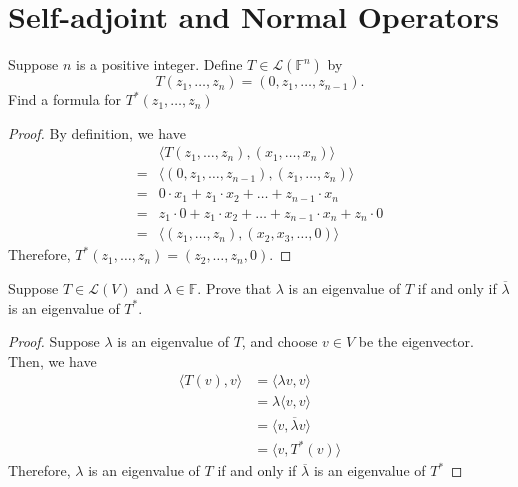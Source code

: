 \section{Self-adjoint and Normal Operators}
\begin{exercise}
  Suppose $n$ is a positive integer. Define $T \in \mathcal{L}(\mathbb{F}^n)$ by \[
    T(z_1, \dots, z_n) = (0, z_1, \dots, z_{n-1}).
  \] Find a formula for $T^*(z_1,\dots,z_n)$
\end{exercise}

\begin{proof}
  By definition, we have
  \begin{equation*}
    \begin{aligned}
      &\langle T(z_1, \dots, z_n), (x_1, \dots ,x_n) \rangle \\
      = &\langle (0, z_1, \dots, z_{n-1}), (z_1, \dots, z_n) \rangle \\
      = &0 \cdot x_1 + z_1 \cdot x_2 + \dots + z_{n-1} \cdot x_n \\
      = &z_1 \cdot 0 + z_1 \cdot x_2 + \dots + z_{n-1} \cdot x_n + z_n \cdot 0 \\
      = &\langle (z_1, \dots, z_n), (x_2, x_3, \dots, 0) \rangle
    \end{aligned}
  \end{equation*}
  Therefore, $T^*(z_1, \dots, z_n) = (z_2, \dots, z_n, 0)$.
\end{proof}

\begin{exercise}
  Suppose $T \in \mathcal{L}(V)$ and $\lambda \in \mathbb{F}$. Prove that
  $\lambda$ is an eigenvalue of $T$ if and only if
  $\overline{\lambda}$ is an eigenvalue of $T^*$.
\end{exercise}

\begin{proof}
  Suppose $\lambda$ is an eigenvalue of $T$, and choose $v \in V$
  be the eigenvector. Then, we have
  \begin{equation*}
    \begin{aligned}
      \langle T(v), v \rangle &= \langle \lambda v, v \rangle\\
      &= \lambda \langle v, v \rangle \\
      &= \langle v, \overline{\lambda} v \rangle \\
      &= \langle v, T^*(v) \rangle
    \end{aligned}
  \end{equation*}
  Therefore, $\lambda$ is an eigenvalue of $T$ if and only if
  $\overline{\lambda}$ is an eigenvalue of $T^*$
\end{proof}


